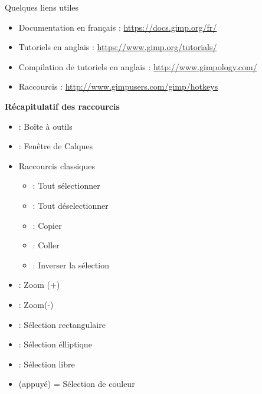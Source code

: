 \appendix


\begin{frame}{Quelques liens utiles}
	\begin{itemize}
		\item Documentation en français : \textcolor{webblue}{\url{https://docs.gimp.org/fr/}}
		\item Tutoriels en anglais : \textcolor{webblue}{\url{https://www.gimp.org/tutorials/}}
		\item Compilation de tutoriels en anglais : \textcolor{webblue}{\url{http://www.gimpology.com/}}
		\item Raccourcis : \textcolor{webblue}{\url{http://www.gimpusers.com/gimp/hotkeys}}
	\end{itemize}
\end{frame}


\begin{frame}
	\textbf{Récapitulatif des raccourcis}
	\begin{itemize}
	\item {} : Boîte à outils
	\item {} : Fenêtre de Calques
	\item Raccourcis classiques
	\begin{itemize}
	 \item {} : Tout sélectionner
	 \item {} : Tout déselectionner
	 \item {} : Copier
	 \item {} : Coller
	 \item {} : Inverser la sélection
	\end{itemize}
	\item \keys{{+}} : Zoom (+)
	\item \keys{-} : Zoom(-)
	\item {} : Sélection rectangulaire
	\item {} : Sélection élliptique
	\item {} : Sélection libre
	\item {} (appuyé) = Sélection de couleur
	\end{itemize}

	\begin{center}
	\end{center}
\end{frame}


